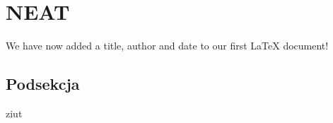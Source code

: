 \section{NEAT}
\label{sec:neat}
We have now added a title, author and date to our first \LaTeX{} document!
\subsection{Podsekcja}
ziut